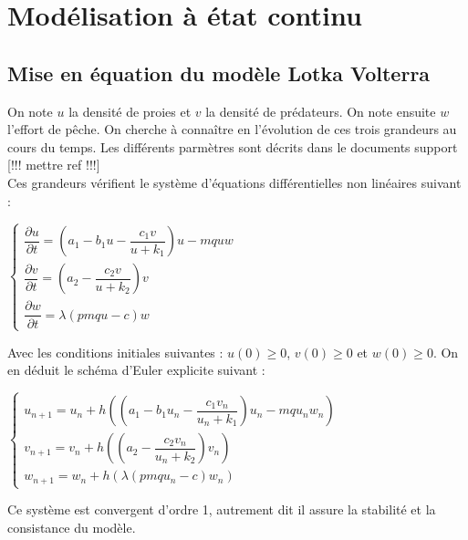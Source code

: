 \documentclass[a4paper, 11pt]{report}%
\begin{document}
    \section{Modélisation à état continu}
        \subsection{Mise en équation du modèle Lotka Volterra}
        On note $u$ la densité de proies et $v$ la densité de prédateurs. On note ensuite $w$ l'effort de pêche. On cherche à connaître en l'évolution de ces trois grandeurs au cours du temps. Les différents parmètres sont décrits dans le documents support [!!! mettre ref !!!]\\
        Ces grandeurs vérifient le système d'équations différentielles non linéaires suivant : 
        \begin{center}
        $ \left\{
            \begin{array}{ll}
                \dfrac{\partial u}{ \partial t} = \left( a_1 - b_1 u - \dfrac{c_1 v}{u+ k_1}  \right) u - mquw \\
                \dfrac{\partial v}{ \partial t} = \left( a_2 - \dfrac{c_2 v}{u+ k_2} \right) v \\
                \dfrac{\partial w}{ \partial t} = \lambda \left( pmqu - c \right) w
            \end{array}
        \right.$
        \end{center}
        Avec les conditions initiales suivantes :  $u(0) \geq 0$, $v(0) \geq 0$ et $w(0) \geq 0$.
        On en déduit le schéma d'Euler explicite suivant : 
        \begin{center}
        $ \left\{
            \begin{array}{ll}
                u_{n+1} = u_n + h \left( \left( a_1 - b_1 u_n - \dfrac{c_1 v_n}{u_n + k_1}  \right) u_n - mqu_n w_n \right)\\
                v_{n+1} = v_n + h \left( \left( a_2 - \dfrac{c_2 v_n}{u_n + k_2} \right) v_n \right) \\
                w_{n+1} = w_n + h \left( \lambda \left( pmq u_n - c \right) w_n \right)
            \end{array}
        \right.$
        \end{center}
        Ce système est convergent d'ordre 1, autrement dit il assure la stabilité et la consistance du modèle.
\end{document}
